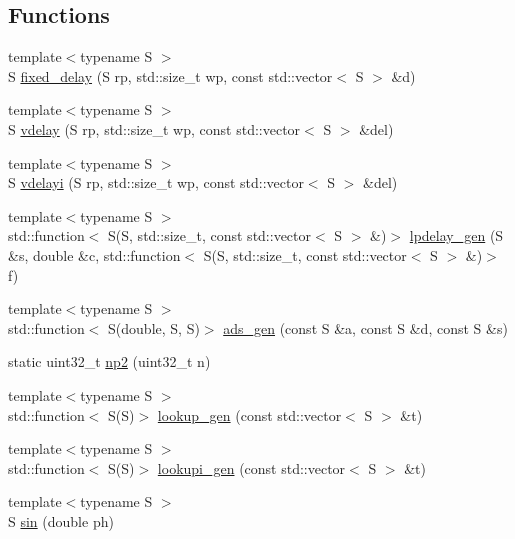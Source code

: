 \subsection*{Functions}
\begin{DoxyCompactItemize}
\item 
{\footnotesize template$<$typename S $>$ }\\S \hyperlink{namespace_aurora_a62442f237e70fdaac1efc22b4e82e875}{fixed\+\_\+delay} (S rp, std\+::size\+\_\+t wp, const std\+::vector$<$ S $>$ \&d)
\item 
{\footnotesize template$<$typename S $>$ }\\S \hyperlink{namespace_aurora_ab93392950e0b9ae8fbbccf7cc1b55a13}{vdelay} (S rp, std\+::size\+\_\+t wp, const std\+::vector$<$ S $>$ \&del)
\item 
{\footnotesize template$<$typename S $>$ }\\S \hyperlink{namespace_aurora_a5318ddb492590ada5dc40ba80bbf655b}{vdelayi} (S rp, std\+::size\+\_\+t wp, const std\+::vector$<$ S $>$ \&del)
\item 
{\footnotesize template$<$typename S $>$ }\\std\+::function$<$ S(S, std\+::size\+\_\+t, const std\+::vector$<$ S $>$ \&)$>$ \hyperlink{namespace_aurora_a8a142312f627aaa19ba0e8a87f33d00b}{lpdelay\+\_\+gen} (S \&s, double \&c, std\+::function$<$ S(S, std\+::size\+\_\+t, const std\+::vector$<$ S $>$ \&)$>$ f)
\item 
{\footnotesize template$<$typename S $>$ }\\std\+::function$<$ S(double, S, S)$>$ \hyperlink{namespace_aurora_a966a076f1768216bd9c2d6a07aebf034}{ads\+\_\+gen} (const S \&a, const S \&d, const S \&s)
\item 
static uint32\+\_\+t \hyperlink{namespace_aurora_a49b6f6d92479d80271ced42627154066}{np2} (uint32\+\_\+t n)
\item 
{\footnotesize template$<$typename S $>$ }\\std\+::function$<$ S(S)$>$ \hyperlink{namespace_aurora_ade912bee8dbe0351b2193809ce592d8b}{lookup\+\_\+gen} (const std\+::vector$<$ S $>$ \&t)
\item 
{\footnotesize template$<$typename S $>$ }\\std\+::function$<$ S(S)$>$ \hyperlink{namespace_aurora_a043c55515e053a8d6f31ed7077a1bea6}{lookupi\+\_\+gen} (const std\+::vector$<$ S $>$ \&t)
\item 
{\footnotesize template$<$typename S $>$ }\\S \hyperlink{namespace_aurora_a388ea5736944d8887f5586afd45a03b8}{sin} (double ph)

\end{DoxyCompactItemize}
